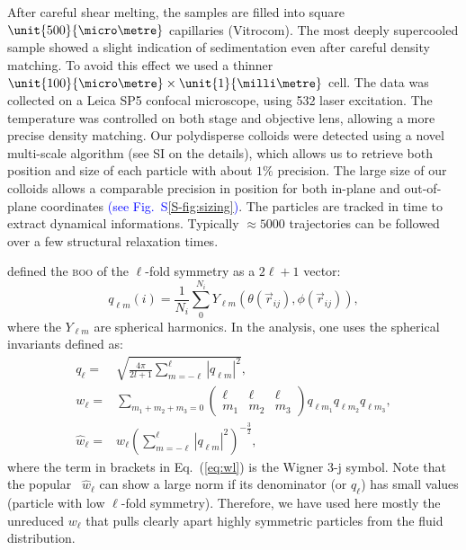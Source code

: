 After careful shear melting, the samples are filled into square $\unit{500}{\micro\metre}$ capillaries (Vitrocom). The most deeply supercooled sample showed a slight indication of sedimentation even after careful density matching. To avoid this effect we used a thinner $\unit{100}{\micro\metre}\times\unit{1}{\milli\metre}$ cell. The data was collected on a Leica SP5 confocal microscope, using \unit{532}{\nano\meter} laser excitation. The temperature was controlled on both stage and objective lens, allowing a more precise density matching. Our polydisperse colloids were detected using a novel multi-scale algorithm (see SI on the details), which allows us to retrieve both position and size of each particle with about $1\%$ precision. The large size of our colloids allows a comparable precision in position for both in-plane and out-of-plane coordinates \textcolor{blue}{(see Fig.~S\ref{S-fig:sizing})}. The particles are tracked in time to extract dynamical informations. Typically $\approx 5000$ trajectories can be followed over a few structural relaxation times.



\citet{steinhardt1983boo} defined the \textsc{boo} of the $\ell$-fold symmetry as a $2\ell+1$ vector:
\begin{equation}
	q_{\ell m}(i) = \frac{1}{N_i}\sum_{0}^{N_i} Y_{\ell m}(\theta(\vec r_{ij}),\phi(\vec r_{ij})),
	\label{eq:qlm}
\end{equation}
where the $Y_{\ell m}$ are spherical harmonics. In the analysis, one uses the spherical invariants defined as:
\begin{align}
	q_\ell =& \sqrt{\frac{4\pi}{2l+1} \sum_{m=-\ell}^{\ell} |q_{\ell m}|^2 }, \label{eq:ql}\\
	w_\ell =& \sum_{m_1+m_2+m_3=0} 
			\left( \begin{array}{ccc}
				\ell & \ell & \ell \\
				m_1 & m_2 & m_3 
			\end{array} \right)
			q_{\ell m_1} q_{\ell m_2} q_{\ell m_3}, \label{eq:wl}\\
	\hat{w}_\ell =& w_\ell{\left( \sum_{m=-\ell}^{\ell} |q_{\ell m}|^2 \right)}^{-\frac{3}{2}},
\end{align}
where the term in brackets in Eq.~(\ref{eq:wl}) is the Wigner 3-j symbol. Note that the popular~\citep{steinhardt1983boo,Lechner2008} $\hat{w}_\ell$ can show a large norm if its denominator (or $q_\ell$) has small values (particle with low $\ell$-fold symmetry). Therefore, we have used here mostly the unreduced $w_\ell$ that pulls clearly apart highly symmetric particles from the fluid distribution.

